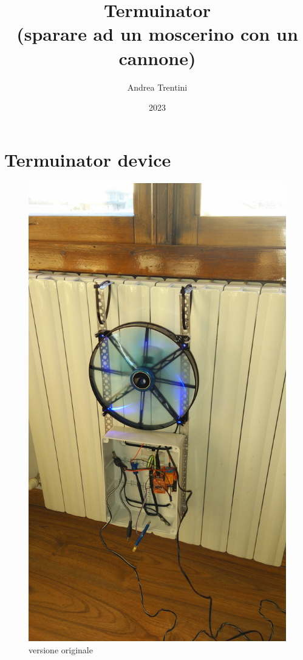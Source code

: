 \documentclass[a4paper,12pt]{article}
\title{Termuinator\\
(sparare ad un moscerino con un cannone)}
\author{Andrea Trentini}
\date{2023}
\begin{document}
\maketitle

\tableofcontents


\newpage


\section{Termuinator device}

\begin{figure}
	\centering
	\includegraphics[height=0.5\textheight]{../docs/img/2016-02-04_16.03.52}
	\caption{versione originale}
	\label{fig:originale}
\end{figure}
\end{document}
